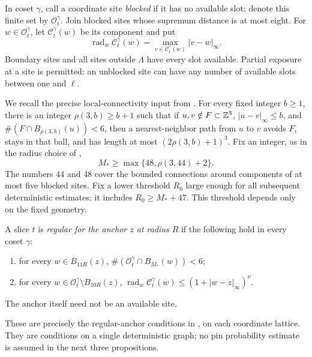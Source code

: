 In coset \(\gamma\), call a coordinate site \emph{blocked} if it has
no available slot; denote this finite set by \(\mathcal O_t^\gamma\).
Join blocked sites whose supremum distance is at most eight.
For \(w\in\mathcal O_t^\gamma\), let \(\mathcal C_t^\gamma(w)\)
be its component and put
\[
 \operatorname{rad}_w\mathcal C_t^\gamma(w)
   =\max_{v\in\mathcal C_t^\gamma(w)}|v-w|_\infty.
\]
Boundary sites and all sites outside \(\Lambda\) have every slot
available.  Partial exposure at a site is permitted: an unblocked site
can have any number of available slots between one and \(\ell\).

We recall the precise local-connectivity input from
\cite[Lemma~5.5]{Ordering}.  For every fixed integer \(b\ge1\), there
is an integer \(\rho(3,b)\ge b+1\) such that if
\(u,v\notin F\subset\mathbb Z^3\), \(|u-v|_\infty\le b\), and
\(\#(F\cap B_{\rho(3,b)}(u))<6\), then a nearest-neighbor path from
\(u\) to \(v\) avoids \(F\), stays in that ball, and has length at
most \((2\rho(3,b)+1)^3\).  Fix an integer, as in the radius choice of
\cite[Equation~(5.13)]{Ordering},
\begin{equation}\label{eq:geometric-radius}
 M_*\ge\max\{48,\rho(3,44)+2\}.
\end{equation}
The numbers 44 and 48 cover the bounded connections around components
of at most five blocked sites.  Fix a lower threshold \(R_0\) large
enough for all subsequent deterministic estimates; it includes
\(R_0\ge M_*+47\).  This threshold depends only on the fixed geometry.

\begin{definition}\label{def:regular}
A slice \(t\) is \emph{regular for the anchor \(z\) at radius \(R\)}
if the following hold in every coset \(\gamma\):
\begin{enumerate}
 \item for every \(w\in B_{11R}(z)\),
 \(\#(\mathcal O_t^\gamma\cap B_{M_*}(w))<6\);
 \item for every \(w\in\mathcal O_t^\gamma\setminus B_{10R}(z)\),
 \(\operatorname{rad}_w\mathcal C_t^\gamma(w)
       \le(1+|w-z|_\infty)^\nu\).
\end{enumerate}
The anchor itself need not be an available site.
\end{definition}

These are precisely the regular-anchor conditions in
\cite[Definition~5.3]{Ordering}, on each coordinate lattice.  They are
conditions on a single deterministic graph; no pin probability estimate
is assumed in the next three propositions.


